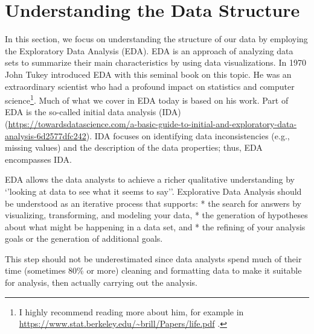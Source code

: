 \documentclass[
]{book}
\begin{document}
\hypertarget{Understanding-the-Data-Structure}{%
\section{Understanding the Data Structure}\label{Understanding-the-Data-Structure}}

In this section, we focus on understanding the structure of our data by employing the Exploratory Data Analysis (EDA). EDA is an approach of analyzing data sets to summarize their main characteristics by using data visualizations. In 1970 John Tukey \citep{Tukey1977eda} introduced EDA with this seminal book on this topic. He was an extraordinary scientist who had a profound impact on statistics and computer science\footnote{I highly recommend reading more about him, for example in \url{https://www.stat.berkeley.edu/~brill/Papers/life.pdf} .}. Much of what we cover in EDA today is based on his work. Part of EDA is the so-called initial data analysis (IDA) (\url{https://towardsdatascience.com/a-basic-guide-to-initial-and-exploratory-data-analysis-6d2577dfc242}). IDA focuses on identifying data inconsistencies (e.g., missing values) and the description of the data properties; thus, EDA encompasses IDA.

EDA allows the data analysts to achieve a richer qualitative understanding by `'looking at data to see what it seems to say''. Explorative Data Analysis should be understood as an iterative process that supports:
* the search for answers by visualizing, transforming, and modeling your data,
* the generation of hypotheses about what might be happening in a data set, and
* the refining of your analysis goals or the generation of additional goals.

This step should not be underestimated since data analysts spend much of their time (sometimes 80\% or more) cleaning and formatting data to make it suitable for analysis, then actually carrying out the analysis.
\end{document}
